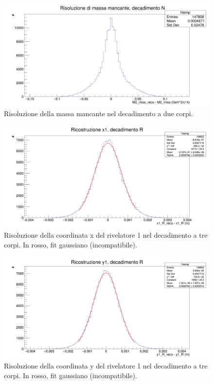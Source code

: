 \documentclass[8pt]{extarticle}
\begin{document}
\begin{figure}[!h]
\begin{center}
\includegraphics[scale=0.25]{reco_miss_N}
\caption{Risoluzione della massa mancante nel decadimento a due corpi.}
\label{fig:reco_miss_N}
\end{center}
\end{figure}

\clearpage

\begin{figure}[!h]
\begin{center}
\includegraphics[scale=0.25]{reco_x1_R}
\caption{Risoluzione della coordinata x del rivelatore 1 nel decadimento a tre corpi. In rosso, fit gaussiano (incompatibile).}
\label{fig:reco_x1_R}
\end{center}
\end{figure}

\begin{figure}[!h]
\begin{center}
\includegraphics[scale=0.25]{reco_y1_R}
\caption{Risoluzione della coordinata y del rivelatore 1 nel decadimento a tre corpi. In rosso, fit gaussiano (incompatibile).}
\label{fig:reco_y1_R}
\end{center}
\end{figure}
\end{document}
